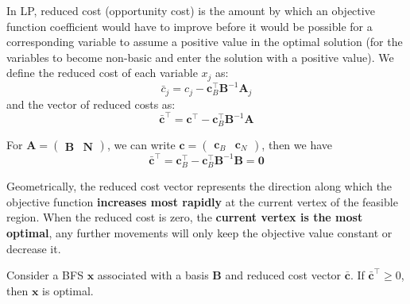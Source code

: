\documentclass{article}
\begin{document}
\begin{definition}
    In LP, reduced cost (opportunity cost) is the amount by which an objective function coefficient would have to improve before it would be possible for a corresponding variable to assume a positive value in the optimal solution (for the variables to become non-basic and  enter the solution with a positive value). We define the reduced cost of each variable $x_j$ as: \begin{equation*}
        \bar{c}_j = c_j - \mathbf{c}^{\top}_B \mathbf{B}^{-1}\mathbf{A}_j
    \end{equation*}
    and the vector of reduced costs as: \begin{equation*}
        \mathbf{\bar{c}}^{\top} = \mathbf{c}^{\top} - \mathbf{c}^{\top}_B \mathbf{B}^{-1}\mathbf{A}
    \end{equation*}
\end{definition}

\noindent For $\mathbf{A} = \begin{pmatrix}
    \mathbf{B} & \mathbf{N}
\end{pmatrix}$, we can write $\mathbf{c} = \begin{pmatrix}
    \mathbf{c}_B & \mathbf{c}_N
\end{pmatrix}$, then we have \begin{equation*}
    \mathbf{\bar{c}^{\top}} = \mathbf{c}^{\top}_B - \mathbf{c}^{\top}_B \mathbf{B}^{-1}\mathbf{B} = \mathbf{0}
\end{equation*}

\noindent Geometrically, the reduced cost vector represents the direction along which the objective function \textbf{increases most rapidly} at the current vertex of the feasible region. When the reduced cost is zero, the \textbf{current vertex is the most optimal}, any further movements will only keep the objective value constant or decrease it.

\begin{theorem}
    Consider a BFS $\mathbf{x}$ associated with a basis $\mathbf{B}$ and reduced cost vector $\mathbf{\bar{c}}$. If $\mathbf{\bar{c}^{\top}} \geq 0$, then $\mathbf{x}$ is optimal.  
\end{theorem}
\end{document}
